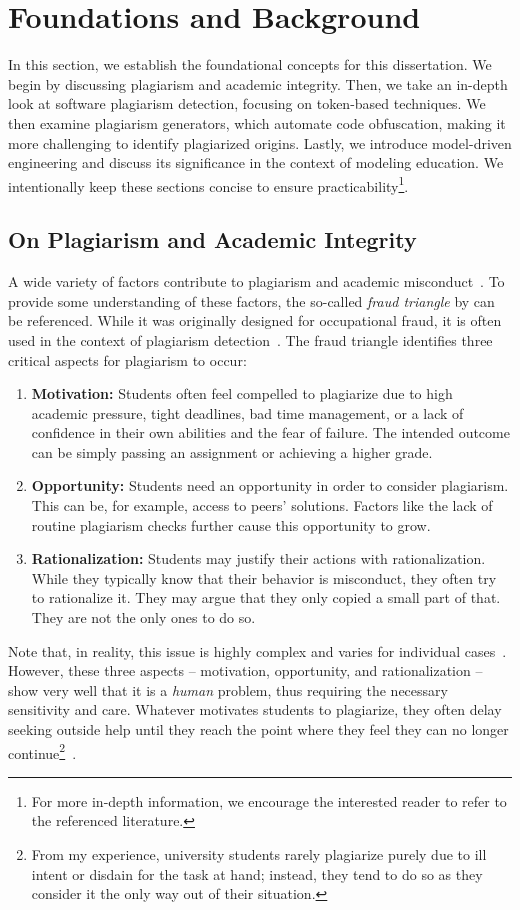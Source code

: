 \chapter{Foundations and Background}\label{ch:foundations}
%
In this section, we establish the foundational concepts for this dissertation.
We begin by discussing plagiarism and academic integrity. Then, we take an in-depth look at software plagiarism detection, focusing on token-based techniques. We then examine plagiarism generators, which automate code obfuscation, making it more challenging to identify plagiarized origins. Lastly, we introduce model-driven engineering and discuss its significance in the context of modeling education.
%
We intentionally keep these sections concise to ensure practicability\footnote{For more in-depth information, we encourage the interested reader to refer to the referenced literature.}.

\section{On Plagiarism and Academic Integrity}

A wide variety of factors contribute to plagiarism and academic misconduct~\cite{Amigud2019}. To provide some understanding of these factors, the so-called \textit{fraud triangle} by \citet{Cressey1953} can be referenced. While it was originally designed for occupational fraud, it is often used in the context of plagiarism detection~\cite{Albluwi2019}. The fraud triangle identifies three critical aspects for plagiarism to occur:
\begin{enumerate}
    \item \textbf{Motivation:} Students often feel compelled to plagiarize due to high academic pressure, tight deadlines, bad time management, or a lack of confidence in their own abilities and the fear of failure. The intended outcome can be simply passing an assignment or achieving a higher grade.
    \item \textbf{Opportunity:} Students need an opportunity in order to consider plagiarism. This can be, for example, access to peers' solutions. Factors like the lack of routine plagiarism checks further cause this opportunity to grow.
    \item \textbf{Rationalization:} Students may justify their actions with rationalization. While they typically know that their behavior is misconduct, they often try to rationalize it. They may argue that they only copied a small part of that. They are not the only ones to do so.
\end{enumerate}
Note that, in reality, this issue is highly complex and varies for individual cases~\cite{Amigud2019}. However, these three aspects -- motivation, opportunity, and rationalization -- show very well that it is a \textit{human} problem, thus requiring the necessary sensitivity and care. Whatever motivates students to plagiarize, they often delay seeking outside help until they reach the point where they feel they can no longer continue\footnote{From my experience, university students rarely plagiarize purely due to ill intent or disdain for the task at hand; instead, they tend to do so as they consider it the only way out of their situation.}~\cite{Amigud2019}.


